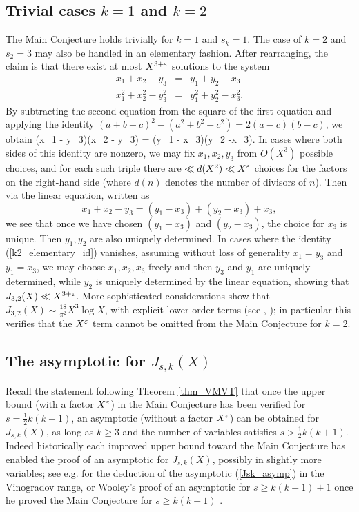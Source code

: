 \documentclass[brochure,english,12pt]{bourbaki}%
\begin{document}
\subsection{Trivial cases $k=1$ and $k=2$}\label{sec_k12}
The Main Conjecture holds trivially for $k=1$ and $s_k=1.$
The case of $k=2$ and $s_2=3$ may also be handled in an elementary fashion. After rearranging, the claim is that there exist at most $X^{3+\varepsilon}$ solutions to the system
\begin{eqnarray*}
x_1 + x_2 - y_3 &=& y_1 + y_2  - x_3 \\
x_1^2 + x_2^2 -y_3^2 & = & y_1^2 + y_2^2- x_3^2 .
\end{eqnarray*}
By subtracting the second equation from the square of the first equation and applying the identity $(a+b-c)^2  - (a^2+b^2  -c^2) =2(a-c)(b-c)$, we  obtain 
\beq\label{k2_elementary_id}
 (x_1 - y_3)(x_2 - y_3)  = (y_1 - x_3)(y_2 -x_3).
 \eeq
In cases where both sides of this identity are nonzero, we may fix $x_1,x_2,y_3$  from $O(X^3)$ possible choices, and for each such triple there are $\ll d(X^2) \ll X^\varepsilon$ choices for the factors on the right-hand side (where $d(n)$ denotes the number of divisors of $n$). Then via the linear equation, written as
\[ x_1 + x_2 - y_3 = (y_1 - x_3) + (y_2 - x_3) + x_3 ,\]
we see that once we have chosen $(y_1 - x_3)$ and $(y_2-x_3)$, the choice for $x_3$ is unique. Then $y_1,y_2$ are also uniquely determined. In cases where the identity (\ref{k2_elementary_id}) vanishes, assuming without loss of generality $x_1=y_3$ and $y_1=x_3$, we may choose $x_1,x_2,x_3$ freely and then $y_3$ and $y_1$ are uniquely determined, while $y_2$ is uniquely determined  by the linear equation, showing that $J_{3,2}(X) \ll X^{3+\varepsilon}$. 
More sophisticated considerations  show that $J_{3,2}(X) \sim \frac{18}{\pi^2} X^3 \log X$, with explicit lower order terms (see \cite{Rog86}, \cite{BloBru10});  in particular this verifies that the $X^\varepsilon$ term cannot be omitted from the Main Conjecture for $k=2$. 



\subsection{The asymptotic for $J_{s,k}(X)$}\label{sec_ep_removal}
Recall the statement following Theorem \ref{thm_VMVT} that once the upper bound (with a factor $X^\varepsilon$) in the Main Conjecture  has been verified for $s=\frac{1}{2}k(k+1)$, an asymptotic (without a factor $X^\varepsilon$) can be obtained for $J_{s,k}(X)$, as long as $k \geq 3$ and the number of variables satisfies $s > \frac{1}{2} k(k+1)$. Indeed historically each improved upper bound toward the Main Conjecture has enabled the proof of an asymptotic for $J_{s,k}(X)$, possibly in slightly more variables; see e.g. \cite[\S 7.3]{Vau97} for the deduction of the asymptotic (\ref{Jsk_asymp}) in the Vinogradov range, or  Wooley's proof of an asymptotic for $s \geq k(k+1)+1$ once he proved the Main Conjecture  for $s \geq k(k+1)$ \cite[\S 9]{Woo12a}.
\end{document}
